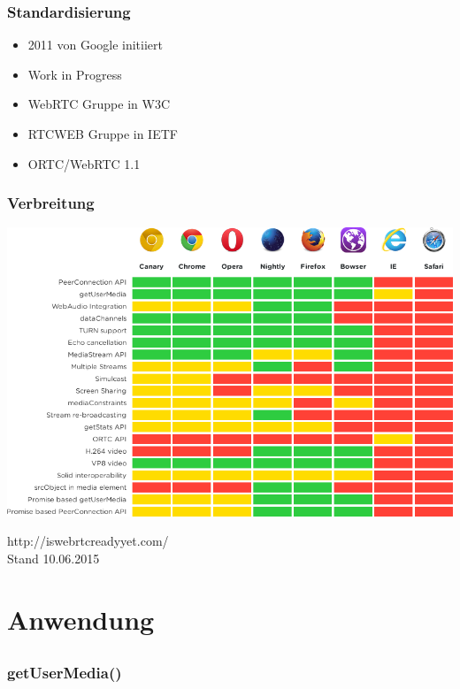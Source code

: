 \documentclass[12pt]{beamer}
\begin{document}
\begin{frame}
  \frametitle{Standardisierung}
  \begin{itemize}
    \item<2-> 2011 von Google initiiert
    \item<3-> Work in Progress
    \item<4-> WebRTC Gruppe in W3C
    \item<5-> RTCWEB Gruppe in IETF
    \item<6-> ORTC/WebRTC 1.1
  \end{itemize}
\end{frame}

\begin{frame}
  \frametitle{Verbreitung}
  \pause
  \centerline{\includegraphics[height=0.7\textheight]{img/webrtc_ready.png}}
  \hfill \tiny http://iswebrtcreadyyet.com/ \\
  \hfill \tiny Stand 10.06.2015
\end{frame}


\section{Anwendung}
\subsection{} 

\begin{frame}
  \frametitle{getUserMedia()}
  \pause
  
\end{frame}
\end{document}
